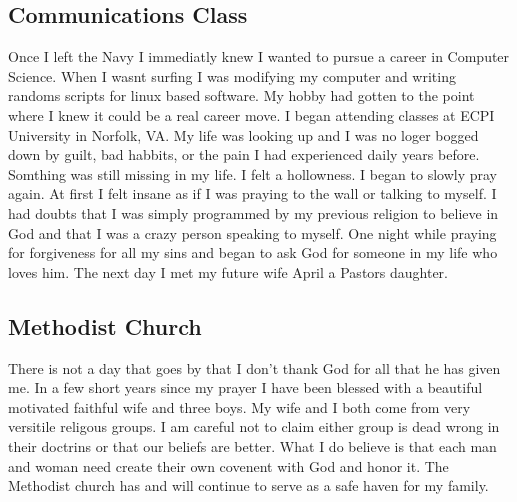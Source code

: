 \documentclass[11pt,a4paper]{scrartcl} %
\begin{document}
\subsection{Communications Class}
\begin{doublespace}
Once I left the Navy I immediatly knew I wanted to pursue a career in Computer Science. When I wasnt surfing I was modifying my computer and writing randoms scripts for linux based software. My hobby had gotten to the point where I knew it could be a real career move. I began attending classes at ECPI University in Norfolk, VA. My life was looking up and I was no loger bogged down by guilt, bad habbits, or the pain I had experienced daily years before. Somthing was still missing in my life. I felt a hollowness. I began to slowly pray again. At first I felt insane as if I was praying to the wall or talking to myself. I had doubts that I was simply programmed by my previous religion to believe in God and that I was a crazy person speaking to myself. One night while praying for forgiveness for all my sins and began to ask God for someone in my life who loves him. The next day I met my future wife April a Pastors daughter. 
\subsection{Methodist Church}
There is not a day that goes by that I don't thank God for all that he has given me. In a few short years since my prayer I have been blessed with a beautiful motivated faithful wife and three boys. My wife and I both come from very versitile religous groups. I am careful not to claim either group is dead wrong in their doctrins or that our beliefs are better. What I do believe is that each man and woman need create their own covenent with God and honor it. The Methodist church has and will continue to serve as a safe haven for my family.

\end{doublespace}
\end{document}
